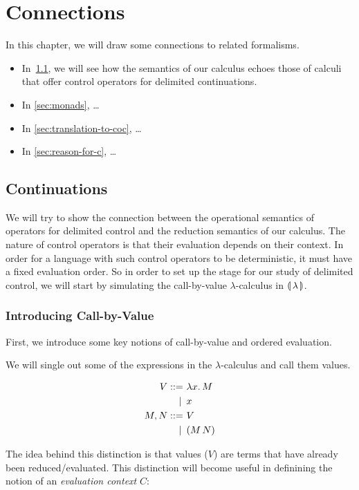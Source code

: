 \chapter{Connections}

In this chapter, we will draw some connections to related formalisms.

\begin{itemize}
\item In~\ref{sec:continuations}, we will see how the semantics of our
  calculus echoes those of calculi that offer control operators for
  delimited continuations.
\item In \ref{sec:monads}, \ldots
\item In \ref{sec:translation-to-coc}, \ldots
\item In \ref{sec:reason-for-c}, \ldots
\end{itemize}

\section{Continuations}
\label{sec:continuations}

We will try to show the connection between the operational semantics of
operators for delimited control and the reduction semantics of our
calculus. The nature of control operators is that their evaluation depends
on their context. In order for a language with such control operators to be
deterministic, it must have a fixed evaluation order. So in order to set up
the stage for our study of delimited control, we will start by simulating
the call-by-value $\lambda$-calculus in $\llparenthesis \, \lambda \, \rrparenthesis$.

\subsection{Introducing Call-by-Value}

First, we introduce some key notions of call-by-value and ordered
evaluation.

We will single out some of the expressions in the $\lambda$-calculus and
call them values.

\begin{align*}
  V ::= &\ \lambda x.\, M \\
   | \, &\ x \\
  M, N ::= &\ V \\
   | \, &\ (M\,N)
\end{align*}

The idea behind this distinction is that values ($V$) are terms that have
already been reduced/evaluated. This distinction will become useful in
definining the notion of an \emph{evaluation context} $C$:

